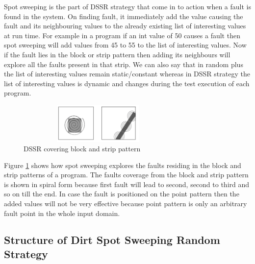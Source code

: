 \documentclass[conference]{IEEEtran}
\begin{document}
Spot sweeping is the part of DSSR strategy that come in to action when a fault is found in the system. On finding fault, it immediately add the value causing the fault and its neighbouring values to the already existing list of interesting values at run time. For example in a program if an int value of 50 causes a fault then spot sweeping will add values from 45 to 55 to the list of interesting values. Now if the fault lies in the block or strip pattern then adding its neighbours will explore all the faults present in that strip. We can also say that in random plus the list of interesting values remain static/constant whereas in DSSR strategy the list of interesting values is dynamic and changes during the test execution of each program.\\

\begin{figure}[ht]
\centering
\includegraphics[width=8cm,height=2cm]{block2.png}
\caption{DSSR covering block and strip pattern}
\label{fig:block2}
\end{figure}

Figure \ref{fig:block2} shows how spot sweeping explores the faults residing in the block and strip patterns of a program. The faults coverage from the block and strip pattern is shown in spiral form because first fault will lead to second, second to third and so on till the end. In case the fault is positioned on the point pattern then the added values will not be very effective because point pattern is only an arbitrary fault point in the whole input domain.

\subsection{Structure of Dirt Spot Sweeping Random Strategy}
\end{document}
